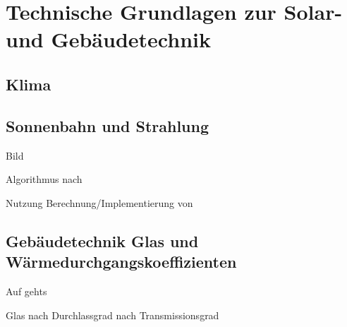 \section{Technische Grundlagen zur Solar- und Gebäudetechnik}

\subsection{Klima}

\cite[S.~295ff.]{ha13}

\subsection{Sonnenbahn und Strahlung}

\cite{therakles13}
\cite[S.~63ff.]{qu11}
\cite[S.~61ff.]{ka13}
\cite[S.~315ff.]{ha13} Bild

Algorithmus nach \cite{re08}

Nutzung Berechnung/Implementierung von \cite{pysolar}

\subsection{Gebäudetechnik Glas und Wärmedurchgangskoeffizienten}
Auf gehts

Glas nach \cite[S.~61ff.]{ha13}
Durchlassgrad nach \cite[S.~604ff.]{ha13}
Transmissionsgrad 


